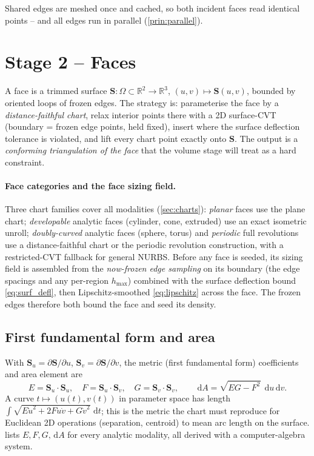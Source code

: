 \documentclass[11pt,a4paper]{article}
\numberwithin{equation}{section}
\newcommand{\R}{\mathbb{R}}
\newcommand{\vv}[1]{\mathbf{#1}}
\newcommand{\dd}{\,\mathrm{d}}
\newcommand{\Su}{\vv{S}_u}
\newcommand{\Sv}{\vv{S}_v}
\begin{document}
\noindent
Shared edges are meshed once and cached, so both incident faces read identical
points -- and all edges run in parallel (\cref{prin:parallel}).

\section{Stage 2 -- Faces}
\label{sec:faces}

A face is a trimmed surface $\vv{S}:\Omega\subset\R^2\to\R^3$, $(u,v)\mapsto
\vv{S}(u,v)$, bounded by oriented loops of frozen edges. The strategy is:
parameterise the face by a \emph{distance-faithful chart}, relax interior points
there with a 2D surface-CVT (boundary = frozen edge points, held fixed), insert
where the surface deflection tolerance is violated, and lift every chart point
exactly onto $\vv{S}$. The output is a \emph{conforming triangulation of the
face} that the volume stage will treat as a hard constraint.

\paragraph{Face categories and the face sizing field.}
Three chart families cover all modalities (\cref{sec:charts}): \emph{planar}
faces use the plane chart; \emph{developable} analytic faces (cylinder, cone,
extruded) use an exact isometric unroll; \emph{doubly-curved} analytic faces
(sphere, torus) and \emph{periodic} full revolutions use a distance-faithful
chart or the periodic revolution construction, with a restricted-CVT fallback
for general NURBS. Before any face is seeded, its sizing field is assembled from
the \emph{now-frozen edge sampling} on its boundary (the edge spacings and any
per-region $h_{\max}$) combined with the surface deflection bound
\eqref{eq:surf_defl}, then Lipschitz-smoothed \eqref{eq:lipschitz} across the
face. The frozen edges therefore both bound the face and seed its density.

\subsection{First fundamental form and area}
With $\Su=\partial\vv{S}/\partial u$, $\Sv=\partial\vv{S}/\partial v$, the metric
(first fundamental form) coefficients and area element are
\begin{equation}
\label{eq:fff}
E=\Su\!\cdot\!\Su,\quad F=\Su\!\cdot\!\Sv,\quad G=\Sv\!\cdot\!\Sv,
\qquad \dd A=\sqrt{EG-F^2}\;\dd u\dd v .
\end{equation}
A curve $t\mapsto(u(t),v(t))$ in parameter space has length
$\int\sqrt{E\dot u^2+2F\dot u\dot v+G\dot v^2}\,\dd t$; this is the metric the
chart must reproduce for Euclidean 2D operations (separation, centroid) to mean
arc length on the surface.  lists $E,F,G,\dd A$ for every analytic
modality, all derived with a computer-algebra system.
\end{document}

